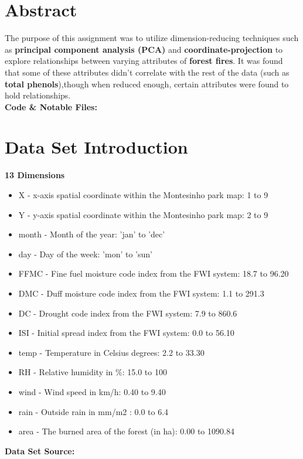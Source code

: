 \documentclass[titlepage,a4paper,12pt,thmsb]{report}
\begin{document}
\chapter*{Abstract}
The purpose of this assignment was to utilize dimension-reducing techniques such as {\bf principal component analysis (PCA)} and {\bf coordinate-projection} to explore relationships between varying attributes of {\bf forest fires}. It was found that some of these attributes didn’t correlate with the rest of the data (such as {\bf total phenols}),though when reduced enough, certain attributes were found to hold relationships.
\vspace*{0.5cm}\\
{\large \bf {Code \& Notable Files:}}
\newline{}
{ }



\chapter*{Data Set Introduction}
{\large \bf {13 Dimensions}}
\begin{itemize}
\item{X - x-axis spatial coordinate within the Montesinho park map: 1 to 9}
\item{Y - y-axis spatial coordinate within the Montesinho park map: 2 to 9}
\item{month - Month of the year: 'jan' to 'dec' }
\item{day - Day of the week: 'mon' to 'sun' }
\item{FFMC - Fine fuel moisture code index from the FWI system: 18.7 to 96.20 }
\item{DMC - Duff moisture code index from the FWI system: 1.1 to 291.3 }
\item{DC - Drought code index from the FWI system: 7.9 to 860.6 }
\item{ISI - Initial spread index from the FWI system: 0.0 to 56.10 }
\item{temp - Temperature in Celsius degrees: 2.2 to 33.30 }
\item{RH - Relative humidity in \%: 15.0 to 100 }
\item{wind - Wind speed in km/h: 0.40 to 9.40 }
\item{rain - Outside rain in mm/m2 : 0.0 to 6.4 }
\item{area - The burned area of the forest (in ha): 0.00 to 1090.84 }
\end{itemize}
{\large \bf {Data Set Source:}}
\newline{}
{ }
\newline{}
\vspace{0.5cm}
\end{document}
